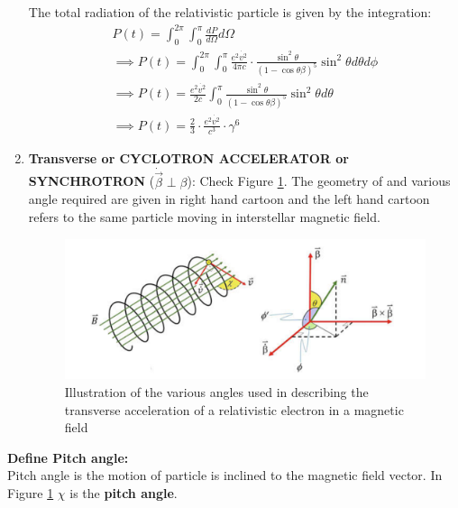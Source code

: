 \documentclass[12pt]{report}
\newcommand{\tbf}[1]{\textbf{#1}}
\newcommand{\de}[2]{\frac{d{#1}}{d{#2}}}
\newcommand{\vd}[1]{\dot{\vec{#1}}}
\begin{document}
\begin{enumerate}
The total radiation of the relativistic particle is given by the integration:
\begin{eqnarray*}
P(t)=\int^{2\pi} _{0} \int^{\pi} _{0} \de{P}{\Omega} d\Omega \\
\implies P(t)=\int^{2\pi} _{0} \int^{\pi} _{0} \frac{e^2 \dot{v^2}}{4 \pi c} \cdot \frac{\sin^2 \theta}{(1- \cos \theta \beta)^5} \sin^2 \theta d\theta d\phi \\
\implies P(t)= \frac{e^2 \dot{v^2}}{2 c} \int^{\pi} _{0}  \frac{\sin^2 \theta}{(1- \cos \theta \beta)^5} \sin^2 \theta d\theta \\
\implies P(t)=\frac{2}{3}\cdot \frac{e^2 \dot{v^2}}{c^3} \cdot \gamma^6
\end{eqnarray*}

\item \tbf{Transverse or CYCLOTRON ACCELERATOR or SYNCHROTRON }($\vd{\beta} \perp \beta$): Check Figure \ref{figtrac}. The geometry of and various angle required are given in right hand cartoon and the left hand cartoon refers to the same particle moving in interstellar magnetic field. 
\begin{figure}[h!]\label{figtrac}
\includegraphics[scale=1]{figtrac}
\caption{ Illustration of the various angles used in describing the transverse acceleration of a relativistic electron in a magnetic field}
\end{figure}
\end{enumerate}
\textbf{Define Pitch angle:}\\
Pitch angle is the motion of particle is inclined to the magnetic field vector. In Figure \ref{figtrac} $\chi$ is the \textbf{pitch angle}.\\
\end{document}
